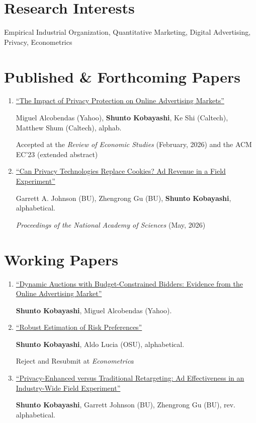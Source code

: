 \documentclass[letterpaper]{article}
\renewenvironment{itemize}{
  \begin{list}{}{
    \setlength{\leftmargin}{1.5em}
  }
}{
  \end{list}
}
\begin{document}
\section*{Research Interests}
\begin{itemize}
\item Empirical Industrial Organization, Quantitative Marketing, Digital Advertising, Privacy, Econometrics 
\end{itemize}

\section*{Published \& Forthcoming Papers}
\begin{enumerate}[resume]
\item \href{https://papers.ssrn.com/sol3/papers.cfm?abstract_id=3782889}{``The Impact of Privacy Protection on Online Advertising Markets''} 

  Miguel Alcobendas (Yahoo), \textbf{Shunto Kobayashi}, Ke Shi (Caltech), Matthew Shum (Caltech), alphab.

  Accepted at the \textit{Review of Economic Studies} (February, 2026) and the ACM EC'23 (extended abstract)

\item \href{https://www.pnas.org/doi/10.1073/pnas.2603752123}{``Can Privacy Technologies Replace Cookies? Ad Revenue in a Field Experiment''}

  Garrett A. Johnson (BU), Zhengrong Gu (BU), \textbf{Shunto Kobayashi}, alphabetical.

  \textit{Proceedings of the National Academy of Sciences} (May, 2026)
\end{enumerate}

\section*{Working Papers}

\begin{enumerate}[resume]
\item \href{https://www.shuntokobayashi.com/assets/files/shunto-kobayashi-jmp.pdf}{``Dynamic Auctions with Budget-Constrained Bidders: Evidence from the Online Advertising Market''} 

  \textbf{Shunto Kobayashi}, Miguel Alcobendas (Yahoo).

\item \href{https://www.dropbox.com/scl/fi/oa78tjw7gdcugii1jg02c/JMP_AldoLucia.pdf}{``Robust Estimation of Risk Preferences''}

  \textbf{Shunto Kobayashi}, Aldo Lucia (OSU), alphabetical.

  Reject and Resubmit at \textit{Econometrica}

\item \href{https://papers.ssrn.com/sol3/papers.cfm?abstract_id=4972368}{``Privacy-Enhanced versus Traditional Retargeting: Ad Effectiveness in an Industry-Wide Field Experiment''}

  \textbf{Shunto Kobayashi}, Garrett Johnson (BU), Zhengrong Gu (BU), rev. alphabetical.
\end{enumerate}
\end{document}
